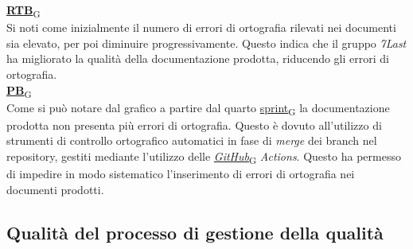 \begin{flushleft}
\href{https://7last.github.io/docs/pb/documentazione-interna/glossario\#requirements-and-technology-baseline}{\textbf{RTB}\textsubscript{G}} \\
Si noti come inizialmente il numero di errori di ortografia rilevati nei documenti sia elevato, per poi diminuire progressivamente. Questo indica che il gruppo \textit{7Last} ha migliorato la qualità della documentazione prodotta, riducendo gli errori di ortografia. \\
\href{https://7last.github.io/docs/pb/documentazione-interna/glossario\#product-baseline}{\textbf{PB}\textsubscript{G}} \\
Come si può notare dal grafico a partire dal quarto \href{https://7last.github.io/docs/pb/documentazione-interna/glossario\#sprint}{sprint\textsubscript{G}} la documentazione prodotta non presenta più errori di ortografia. Questo è dovuto all'utilizzo di strumenti di controllo ortografico automatici in fase di \textit{merge} dei branch nel repository, gestiti mediante l'utilizzo delle \href{https://7last.github.io/docs/pb/documentazione-interna/glossario\#github}{\textit{GitHub}\textsubscript{G}}\textit{ Actions}. Questo ha permesso di impedire in modo sistematico l'inserimento di errori di ortografia nei documenti prodotti.
\end{flushleft}

\newpage
\subsection{Qualità del processo di gestione della qualità}
